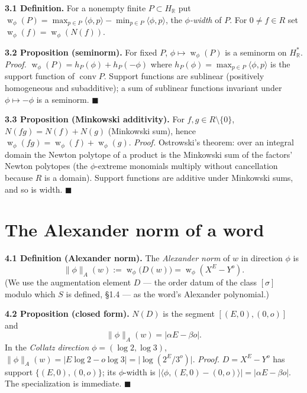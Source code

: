 \documentclass[11pt]{article}
\begin{document}
\textbf{3.1 Definition.} For a nonempty finite $P\subset H_{\mathbb R}$ put
$\operatorname{w}_\phi(P)=\max_{p\in P}\langle\phi,p\rangle-\min_{p\in P}\langle\phi,p\rangle$,
the \emph{$\phi$-width} of $P$. For $0\ne f\in R$ set
$\operatorname{w}_\phi(f)=\operatorname{w}_\phi(N(f))$.

\medskip
\textbf{3.2 Proposition (seminorm).} For fixed $P$, $\phi\mapsto\operatorname{w}_\phi(P)$
is a seminorm on $H_{\mathbb R}^{*}$.
\emph{Proof.} $\operatorname{w}_\phi(P)=h_{P}(\phi)+h_{P}(-\phi)$ where
$h_P(\phi)=\max_{p\in P}\langle\phi,p\rangle$ is the support function of
$\operatorname{conv}P$. Support functions are sublinear (positively homogeneous and
subadditive); a sum of sublinear functions invariant under $\phi\mapsto-\phi$ is a
seminorm. \hfill$\blacksquare$

\medskip
\textbf{3.3 Proposition (Minkowski additivity).} For $f,g\in R\setminus\{0\}$,
$N(fg)=N(f)+N(g)$ (Minkowski sum), hence
$\operatorname{w}_\phi(fg)=\operatorname{w}_\phi(f)+\operatorname{w}_\phi(g)$.
\emph{Proof.} Ostrowski's theorem: over an integral domain the Newton polytope of a
product is the Minkowski sum of the factors' Newton polytopes (the $\phi$-extreme
monomials multiply without cancellation because $R$ is a domain). Support functions are
additive under Minkowski sums, and so is width. \hfill$\blacksquare$

\hrulefill

\section{The Alexander norm of a word}

\textbf{4.1 Definition (Alexander norm).} The \emph{Alexander norm} of $w$ in direction
$\phi$ is
\[
\lVert\phi\rVert_{A}(w):=\operatorname{w}_\phi\big(D(w)\big)=\operatorname{w}_\phi(X^{E}-Y^{o}).
\]
(We use the augmentation element $D$ --- the order datum of the class $[\sigma]$ modulo
which $S$ is defined, \S1.4 --- as the word's Alexander polynomial.)

\medskip
\textbf{4.2 Proposition (closed form).} $N(D)$ is the segment $[(E,0),(0,o)]$ and
\[
\lVert\phi\rVert_{A}(w)=|\alpha E-\beta o|.
\]
In the \emph{Collatz direction} $\phi=(\log2,\log3)$,
$\lVert\phi\rVert_A(w)=|E\log2-o\log3|=\big|\log(2^{E}/3^{o})\big|$.
\emph{Proof.} $D=X^{E}-Y^{o}$ has support $\{(E,0),(0,o)\}$; its $\phi$-width is
$|\langle\phi,(E,0)-(0,o)\rangle|=|\alpha E-\beta o|$. The specialization is immediate.
\hfill$\blacksquare$
\end{document}
